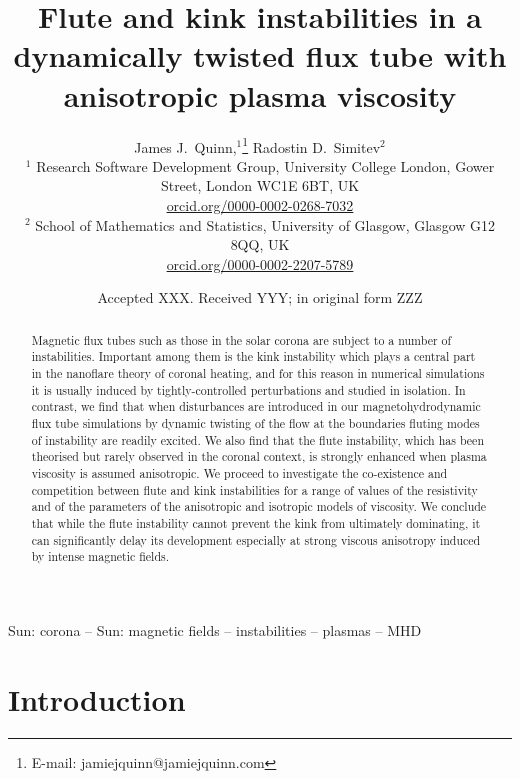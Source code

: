 \documentclass[fleqn,usenatbib]{mnras}
\title{Flute and kink instabilities in a dynamically twisted
    flux tube with anisotropic plasma viscosity}
\author[J.~Quinn and R.~Simitev]{
James J.~Quinn,$^{1}$\thanks{E-mail: jamiejquinn@jamiejquinn.com}
Radostin D.~Simitev$^{2}$
\\
$^{1}$ Research Software Development Group, University College London, Gower Street, London WC1E 6BT, UK \\
\href{https://orcid.org/0000-0002-0268-7032}{orcid.org/0000-0002-0268-7032} \\
$^2$ School of Mathematics and Statistics, University of Glasgow,
Glasgow G12 8QQ,
UK \\ \href{https://orcid.org/0000-0002-2207-5789}{orcid.org/0000-0002-2207-5789}\\
}
\date{Accepted XXX. Received YYY; in original form ZZZ}
\begin{document}
\label{firstpage}
\pagerange{\pageref{firstpage}--\pageref{lastpage}}
\maketitle


\graphicspath{{images/kink_instability_straight/}}

\begin{abstract}
Magnetic flux tubes such as those in the solar corona are subject to a number
of instabilities. Important among them is the kink instability which plays
a central part in the nanoflare theory of coronal heating, and for this reason
in numerical simulations it is usually induced by tightly-controlled
perturbations and studied in isolation. In contrast, we find that when
disturbances are introduced in our magnetohydrodynamic flux tube simulations by
dynamic twisting of the flow at the boundaries fluting modes of instability are
readily excited. We also find that the flute instability, which has been
theorised but rarely observed in the coronal context,  is strongly enhanced
when plasma viscosity is assumed anisotropic. We proceed to investigate the
co-existence and competition between flute and kink instabilities for a range
of values of the resistivity and of the parameters of the anisotropic and
isotropic models of viscosity. We conclude that while the flute instability
cannot prevent the kink from ultimately dominating, it can significantly delay
its development especially at strong viscous anisotropy induced by intense
magnetic fields.
\end{abstract}

\begin{keywords}
Sun: corona -- Sun: magnetic fields -- instabilities -- plasmas -- MHD
\end{keywords}

\section{Introduction}
\end{document}

